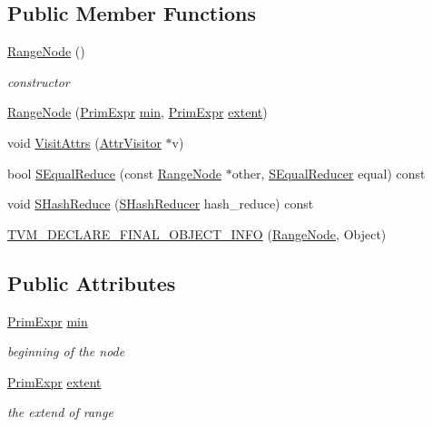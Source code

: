 \subsection*{Public Member Functions}
\begin{DoxyCompactItemize}
\item 
\hyperlink{classtvm_1_1RangeNode_ab845f7ed4ed85e360b730df3450d1aab}{Range\+Node} ()
\begin{DoxyCompactList}\small\item\em constructor \end{DoxyCompactList}\item 
\hyperlink{classtvm_1_1RangeNode_a6ee2e11a496cc52627354fd90f00e2a0}{Range\+Node} (\hyperlink{classtvm_1_1PrimExpr}{Prim\+Expr} \hyperlink{classtvm_1_1RangeNode_a43d2fb12bb61cf05936a1972d0158b49}{min}, \hyperlink{classtvm_1_1PrimExpr}{Prim\+Expr} \hyperlink{classtvm_1_1RangeNode_acd2ddcfab1f591a6c1f2568dd0180845}{extent})
\item 
void \hyperlink{classtvm_1_1RangeNode_a4922785883bc78fdcdaa8169c85e63c9}{Visit\+Attrs} (\hyperlink{classtvm_1_1AttrVisitor}{Attr\+Visitor} $\ast$v)
\item 
bool \hyperlink{classtvm_1_1RangeNode_a64d94b3a2f18ab2e946926559c8a6a00}{S\+Equal\+Reduce} (const \hyperlink{classtvm_1_1RangeNode}{Range\+Node} $\ast$other, \hyperlink{classtvm_1_1SEqualReducer}{S\+Equal\+Reducer} equal) const 
\item 
void \hyperlink{classtvm_1_1RangeNode_a80bd0fe8be559acfacd5e5d90c938b2f}{S\+Hash\+Reduce} (\hyperlink{classtvm_1_1SHashReducer}{S\+Hash\+Reducer} hash\+\_\+reduce) const 
\item 
\hyperlink{classtvm_1_1RangeNode_a7cfc39cadf205d093bc6c51d5912f81a}{T\+V\+M\+\_\+\+D\+E\+C\+L\+A\+R\+E\+\_\+\+F\+I\+N\+A\+L\+\_\+\+O\+B\+J\+E\+C\+T\+\_\+\+I\+N\+FO} (\hyperlink{classtvm_1_1RangeNode}{Range\+Node}, Object)
\end{DoxyCompactItemize}
\subsection*{Public Attributes}
\begin{DoxyCompactItemize}
\item 
\hyperlink{classtvm_1_1PrimExpr}{Prim\+Expr} \hyperlink{classtvm_1_1RangeNode_a43d2fb12bb61cf05936a1972d0158b49}{min}
\begin{DoxyCompactList}\small\item\em beginning of the node \end{DoxyCompactList}\item 
\hyperlink{classtvm_1_1PrimExpr}{Prim\+Expr} \hyperlink{classtvm_1_1RangeNode_acd2ddcfab1f591a6c1f2568dd0180845}{extent}
\begin{DoxyCompactList}\small\item\em the extend of range \end{DoxyCompactList}\end{DoxyCompactItemize}
